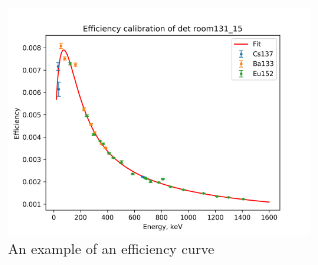 \begin{figure}
    \centering
    \includegraphics[width=8cm]{Experiment/room131_15.png}
    \caption{An example of an efficiency curve}
    \label{fig:efficiency_curve}
\end{figure}


